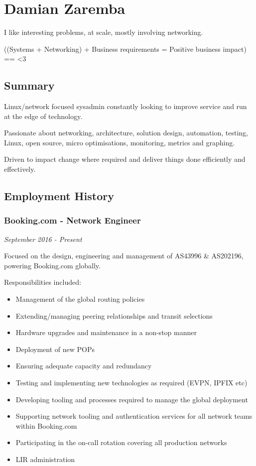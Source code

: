 \section{Damian Zaremba}\label{damian-zaremba}

I like interesting problems, at scale, mostly involving networking.

((Systems + Networking) + Business requirements = Positive business
impact) == \textless{}3

\subsection{Summary}\label{summary}

Linux/network focused sysadmin constantly looking to improve service and
run at the edge of technology.

Passionate about networking, architecture, solution design, automation,
testing, Linux, open source, micro optimisations, monitoring, metrics
and graphing.

Driven to impact change where required and deliver things done
efficiently and effectively.

\subsection{Employment History}\label{employment-history}

\subsubsection{Booking.com - Network
Engineer}\label{booking.com---network-engineer}

\emph{September 2016 - Present}

Focused on the design, engineering and management of AS43996 \&
AS202196, powering Booking.com globally.

Responsibilities included:

\begin{itemize}
\tightlist
\item
  Management of the global routing policies
\item
  Extending/managing peering relationships and transit selections
\item
  Hardware upgrades and maintenance in a non-stop manner
\item
  Deployment of new POPs
\item
  Ensuring adequate capacity and redundancy
\item
  Testing and implementing new technologies as required (EVPN, IPFIX
  etc)
\item
  Developing tooling and processes required to manage the global
  deployment
\item
  Supporting network tooling and authentication services for all network
  teams within Booking.com
\item
  Participating in the on-call rotation covering all production networks
\item
  LIR administration
\end{itemize}

